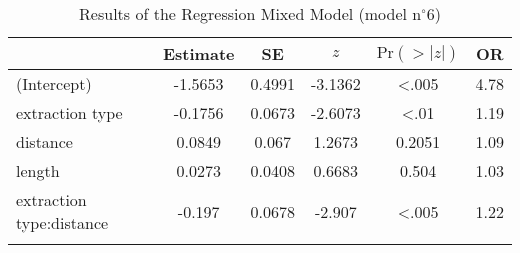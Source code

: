 \begin{table}
\begin{tabular}{l S[table-format=-1.4] S[table-format=1.4] S[table-format=-1.4] S[table-format=<1.4] S[table-format=2.2]}
  \lsptoprule
 & {Estimate} & {SE} & {$z$} & {$\text{Pr}(>|z|)$} & {OR} \\ 
  \midrule
(Intercept) & -1.5653 & 0.4991 & -3.1362 & <.005 & 4.78 \\ 
  extraction type & -0.1756 & 0.0673 & -2.6073 & <.01 & 1.19 \\ 
  distance & 0.0849 & 0.067 & 1.2673 & 0.2051 & 1.09 \\ 
  length & 0.0273 & 0.0408 & 0.6683 & 0.504 & 1.03 \\ 
  extraction type:distance & -0.197 & 0.0678 & -2.907 & <.005 & 1.22 \\ 
   \lspbottomrule
\end{tabular}
\caption{Results of the Regression Mixed Model (model n$^{\circ}$6)}
\label{tab:exp03-m6}
\end{table}
